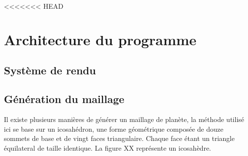 \documentclass[10pt]{report}
\begin{document}
  
 

  
  
  
  

  
  
  \tableofcontents
  
  \thispagestyle{empty} %
  

  \newpage
  
  
  

  
  
  
  
  
  \newpage
  
  
  
  

  

  

<<<<<<< HEAD
  	
  \chapter{Architecture du programme}
	
    
  
  \section{Système de rendu}
  \section{Génération du maillage}	%
	Il existe plusieurs manières de générer un maillage de planète, la méthode utilisé ici
	se base sur un icosahédron, une forme géométrique composée de douze sommets de base et 
	de vingt faces triangulaire. Chaque face étant un triangle équilateral de taille identique.
	La figure XX représente un icosahèdre.\\
\end{document}
